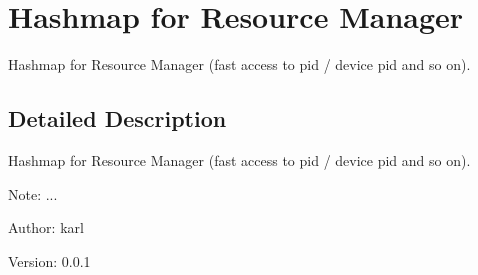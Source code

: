 \hypertarget{group___h_a_s_h_m_a_p}{
\section{Hashmap for Resource Manager}
\label{group___h_a_s_h_m_a_p}
}
Hashmap for Resource Manager (fast access to pid / device pid and so on).  




\subsection{Detailed Description}
Hashmap for Resource Manager (fast access to pid / device pid and so on). 

\begin{Desc}
\item[Note:]... \end{Desc}
\begin{Desc}
\item[Author:]karl \end{Desc}
\begin{Desc}
\item[Version:]0.0.1 \end{Desc}
